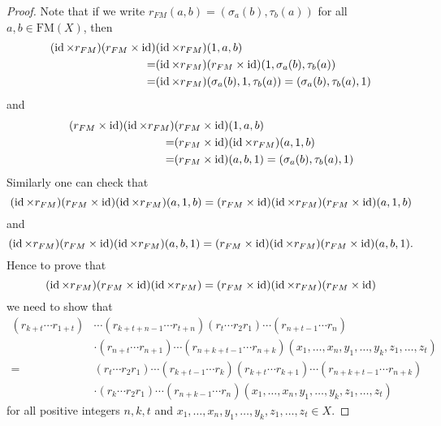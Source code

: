 \begin{proof}
Note that if we write $r_{FM}(a,b)=(\sigma_a(b),\tau_b(a))$ for all $a,b\in \mathrm{FM}(X)$, then
\begin{align*}
(\operatorname{id}\times r_{FM})(r_{FM}\times \operatorname{id})&(\operatorname{id}\times r_{FM})(1,a,b)\\
=&(\operatorname{id}\times r_{FM})(r_{FM}\times \operatorname{id})(1,\sigma_a(b),\tau_b(a))\\
=&(\operatorname{id}\times r_{FM})(\sigma_a(b),1,\tau_b(a))=(\sigma_a(b),\tau_b(a),1)
\end{align*}
and
\begin{align*}
(r_{FM}\times \operatorname{id})(\operatorname{id}\times r_{FM})&(r_{FM}\times \operatorname{id})(1,a,b)\\
=&(r_{FM}\times \operatorname{id})(\operatorname{id}\times r_{FM})(a,1,b)\\
=&(r_{FM}\times \operatorname{id})(a,b,1)=(\sigma_a(b),\tau_b(a),1)
\end{align*}
Similarly one can check that
\[(\operatorname{id}\times r_{FM})(r_{FM}\times \operatorname{id})(\operatorname{id}\times r_{FM})(a,1,b)=
(r_{FM}\times \operatorname{id})(\operatorname{id}\times r_{FM})(r_{FM}\times \operatorname{id})(a,1,b)\]
and
\[(\operatorname{id}\times r_{FM})(r_{FM}\times \operatorname{id})(\operatorname{id}\times r_{FM})(a,b,1)=
(r_{FM}\times \operatorname{id})(\operatorname{id}\times r_{FM})(r_{FM}\times \operatorname{id})(a,b,1).\]
Hence
to prove that
\[(\operatorname{id}\times r_{FM})(r_{FM}\times \operatorname{id})(\operatorname{id}\times r_{FM})=(r_{FM}\times \operatorname{id})(\operatorname{id}\times r_{FM})(r_{FM}\times \operatorname{id})\]
we need to show that
\begin{align*}
    (r_{k+t}\cdots r_{1+t})&\cdots (r_{k+t+n-1}\cdots r_{t+n})(r_{t}\cdots r_2r_{1})\cdots (r_{n+t-1}\cdots r_{n})\\
    &\cdot (r_{n+t}\cdots r_{n+1})\cdots (r_{n+k+t-1}\cdots r_{n+k})
    (x_1,\dots ,x_n,y_1,\dots ,y_k,z_1,\dots,z_t)\\
    =&(r_{t}\cdots r_2r_{1})\cdots (r_{k+t-1}\cdots r_{k})(r_{k+t}\cdots r_{k+1})\cdots (r_{n+k+t-1}\cdots r_{n+k})\\
    &\cdot (r_{k}\cdots r_2r_{1})\cdots (r_{n+k-1}\cdots r_{n})(x_1,\dots ,x_n,y_1,\dots ,y_k,z_1,\dots,z_t)
\end{align*}
for all positive integers $n,k,t$ and $x_1,\dots ,x_n,y_1,\dots ,y_k,z_1,\dots ,z_t\in X$.


\end{proof}
